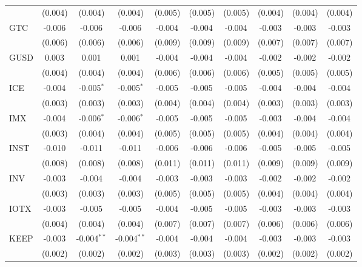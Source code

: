 \begin{table}[!htbp]
\begin{tabular}{@{\extracolsep{5pt}}lccccccccc}
  & (0.004) & (0.004) & (0.004) & (0.005) & (0.005) & (0.005) & (0.004) & (0.004) & (0.004) \\
 GTC & -0.006$^{}$ & -0.006$^{}$ & -0.006$^{}$ & -0.004$^{}$ & -0.004$^{}$ & -0.004$^{}$ & -0.003$^{}$ & -0.003$^{}$ & -0.003$^{}$ \\
  & (0.006) & (0.006) & (0.006) & (0.009) & (0.009) & (0.009) & (0.007) & (0.007) & (0.007) \\
 GUSD & 0.003$^{}$ & 0.001$^{}$ & 0.001$^{}$ & -0.004$^{}$ & -0.004$^{}$ & -0.004$^{}$ & -0.002$^{}$ & -0.002$^{}$ & -0.002$^{}$ \\
  & (0.004) & (0.004) & (0.004) & (0.006) & (0.006) & (0.006) & (0.005) & (0.005) & (0.005) \\
 ICE & -0.004$^{}$ & -0.005$^{*}$ & -0.005$^{*}$ & -0.005$^{}$ & -0.005$^{}$ & -0.005$^{}$ & -0.004$^{}$ & -0.004$^{}$ & -0.004$^{}$ \\
  & (0.003) & (0.003) & (0.003) & (0.004) & (0.004) & (0.004) & (0.003) & (0.003) & (0.003) \\
 IMX & -0.004$^{}$ & -0.006$^{*}$ & -0.006$^{*}$ & -0.005$^{}$ & -0.005$^{}$ & -0.005$^{}$ & -0.003$^{}$ & -0.004$^{}$ & -0.004$^{}$ \\
  & (0.003) & (0.004) & (0.004) & (0.005) & (0.005) & (0.005) & (0.004) & (0.004) & (0.004) \\
 INST & -0.010$^{}$ & -0.011$^{}$ & -0.011$^{}$ & -0.006$^{}$ & -0.006$^{}$ & -0.006$^{}$ & -0.005$^{}$ & -0.005$^{}$ & -0.005$^{}$ \\
  & (0.008) & (0.008) & (0.008) & (0.011) & (0.011) & (0.011) & (0.009) & (0.009) & (0.009) \\
 INV & -0.003$^{}$ & -0.004$^{}$ & -0.004$^{}$ & -0.003$^{}$ & -0.003$^{}$ & -0.003$^{}$ & -0.002$^{}$ & -0.002$^{}$ & -0.002$^{}$ \\
  & (0.003) & (0.003) & (0.003) & (0.005) & (0.005) & (0.005) & (0.004) & (0.004) & (0.004) \\
 IOTX & -0.003$^{}$ & -0.005$^{}$ & -0.005$^{}$ & -0.004$^{}$ & -0.005$^{}$ & -0.005$^{}$ & -0.003$^{}$ & -0.003$^{}$ & -0.003$^{}$ \\
  & (0.004) & (0.004) & (0.004) & (0.007) & (0.007) & (0.007) & (0.006) & (0.006) & (0.006) \\
 KEEP & -0.003$^{}$ & -0.004$^{**}$ & -0.004$^{**}$ & -0.004$^{}$ & -0.004$^{}$ & -0.004$^{}$ & -0.003$^{}$ & -0.003$^{}$ & -0.003$^{}$ \\
  & (0.002) & (0.002) & (0.002) & (0.003) & (0.003) & (0.003) & (0.002) & (0.002) & (0.002) \\

\end{tabular}
\end{table}

